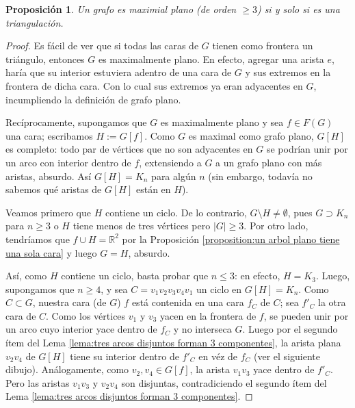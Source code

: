 \documentclass[12pt]{report}
\theoremstyle{plain}
\newtheorem{proposition}[theorem]{Proposición}
\theoremstyle{definition}
\newcommand{\reals}{\mathbb{R}}
\newcommand{\abs}[1]{\left \vert #1 \right \vert}
\begin{document}
\begin{proposition}\label{proposition:un grafo es maximalmente plano si y solo si es una triangulacion}
Un grafo es maximial plano (de orden $\geq 3$) si y solo si es una triangulación.
\end{proposition}
\begin{proof}
Es fácil de ver que si todas las caras de $G$ tienen como frontera un triángulo, entonces $G$ es maximalmente plano. En efecto, agregar una arista $e$, haría que su interior estuviera adentro de una cara de $G$ y sus extremos en la frontera de dicha cara. Con lo cual sus extremos ya eran adyacentes en $G$, incumpliendo la definición de grafo plano.

Recíprocamente, supongamos que $G$ es maximalmente plano y sea $f \in F(G)$ una cara; escribamos $H := G[f]$. Como $G$ es maximal como grafo plano, $G[H]$ es completo: todo par de vértices que no son adyacentes en $G$ se podrían unir por un arco con interior dentro de $f$, extensiendo a $G$ a un grafo plano con más aristas, absurdo. Así $G [H] = K_n$ para algún $n$ (sin embargo, todavía no sabemos qué aristas de $G[H]$ están en $H$).

Veamos primero que $H$ contiene un ciclo. De lo contrario, $G \setminus H \neq \emptyset$, pues $G \supset K_n$ para $n \geq 3$ o $H$ tiene menos de tres vértices pero $\abs G \geq 3$. Por otro lado, tendríamos que $f \cup H = \reals^2$ por la Proposición \ref{proposition:un arbol plano tiene una sola cara} y luego $G = H$, absurdo.

Así, como $H$ contiene un ciclo, basta probar que $n \leq 3$: en efecto, $H = K_3$. Luego, supongamos que $n \geq 4$, y sea $C = v_1 v_2 v_3 v_4 v_1$ un ciclo en $G[H] = K_n$. Como $C \subset G$, nuestra cara (de $G$) $f$ está contenida en una cara $f_C$ de $C$; sea $f'_C$ la otra cara de $C$. Como los vértices $v_1$ y $v_3$ yacen en la frontera de $f$, se pueden unir por un arco cuyo interior yace dentro de $f_C$ y no interseca $G$. Luego por el segundo ítem del Lema \ref{lema:tres arcos disjuntos forman 3 componentes}, la arista plana $v_2 v_4$ de $G[H]$ tiene su interior dentro de $f'_C$ en véz de $f_C$ (ver el siguiente dibujo). Análogamente, como $v_2, v_4 \in G[f]$, la arista $v_{1}v_3$ yace dentro de $f'_C$. Pero las aristas $v_{1}v_3$ y $v_2 v_4$ son disjuntas, contradiciendo el segundo ítem del Lema \ref{lema:tres arcos disjuntos forman 3 componentes}.
\end{proof}

\end{document}
